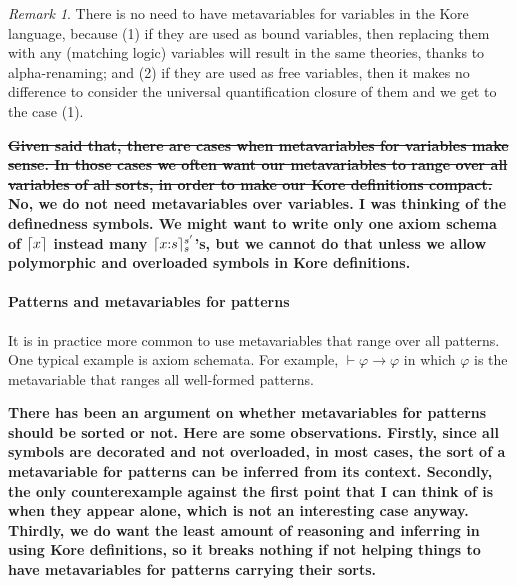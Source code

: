 \documentclass{article}
\newcommand{\comment}[1]
    {\par {\bfseries \color{blue} #1 \par}} %
\newcounter{thmcounter}
\theoremstyle{plain}
\theoremstyle{definition}
\theoremstyle{remark}
\newtheorem{remark}[thmcounter]{Remark}
\newcommand{\cln}{{:}}
\DeclarePairedDelimiter{\ceil}{\lceil}{\rceil}
\begin{document}
\begin{remark}
\label{no_need_to_have_metavariables_for_variables}
There is no need to have metavariables for variables in the Kore language, because (1) if they are used as bound variables, then replacing them with any (matching logic) variables will result in the same theories, thanks to alpha-renaming; and (2) if they are used as free variables, then it makes no difference to consider the universal quantification closure of them and we get to the case (1). 
\comment{\sout{Given said that, there are cases when metavariables for variables make sense. In those cases we often want our metavariables to range over all variables of all sorts, in order to make our Kore definitions compact.} No, we do not need metavariables over variables. I was thinking of the definedness symbols. We might want to write only one axiom schema of $\ceil{x}$ instead many $\ceil{x \cln s}_s^{s'}$'s, but we cannot do that unless we allow polymorphic and overloaded symbols in Kore definitions.}
\end{remark}

\paragraph{Patterns and metavariables for patterns}

It is in practice more common to use metavariables that range over all patterns. One typical example is axiom schemata. For example, $\vdash \varphi \to \varphi$ in which $\varphi$ is the metavariable that ranges all well-formed patterns. 

\comment{There has been an argument on whether metavariables for patterns should be sorted or not. Here are some observations. Firstly, since all symbols are decorated and not overloaded, in most cases, the sort of a metavariable for patterns can be inferred from its context. Secondly, the only counterexample against the first point that I can think of is when they appear alone, which is not an interesting case anyway. Thirdly, we do want the least amount of reasoning and inferring in using Kore definitions, so it breaks nothing if not helping things to have metavariables for patterns carrying their sorts.}
\end{document}
